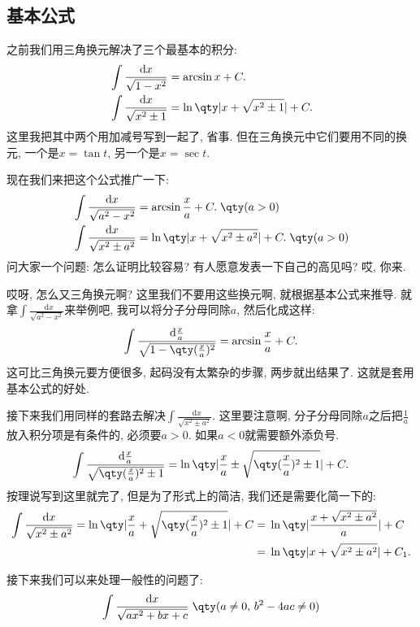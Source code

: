 \documentclass{ctexbook}
\newcommand*{\dif}{\mathop{}\!\mathrm{d}}
\begin{document}
{\subsection{基本公式}
之前我们用三角换元解决了三个最基本的积分: 
\begin{align*}
{}&\int\frac{\dif{x}}{\sqrt{1-x^{2}}}=\arcsin{x}+C.\\
{}&\int\frac{\dif{x}}{\sqrt{x^{2}\pm1}}=\ln\qty|x+\sqrt{x^{2}\pm1}|+C
.\end{align*}
这里我把其中两个用加减号写到一起了, 省事. 但在三角换元中它们要用不同的换元, 一个是$x=\tan{t}$, 另一个是$x=\sec{t}$. \par
现在我们来把这个公式推广一下: 
\begin{align*}
{}&\int\frac{\dif{x}}{\sqrt{a^{2}-x^{2}}}=\arcsin{\frac{x}{a}}+C.\;\qty(a>0)\\
{}&\int\frac{\dif{x}}{\sqrt{x^{2}\pm a^{2}}}=\ln\qty|x+\sqrt{x^{2}\pm a^{2}}|+C.\;\qty(a>0)
\end{align*}
问大家一个问题: 怎么证明比较容易? 有人愿意发表一下自己的高见吗? 哎, 你来. \par
哎呀, 怎么又三角换元啊? 这里我们不要用这些换元啊, 就根据基本公式来推导. 就拿$\int\frac{\dif{x}}{\sqrt{a^{2}-x^{2}}}$来举例吧, 我可以将分子分母同除$a$, 然后化成这样: 
\begin{align*}
\int\frac{\dif{\frac{x}{a}}}{\sqrt{1-\qty(\frac{x}{a})^{2}}}=\arcsin{\frac{x}{a}}+C
.\end{align*}
这可比三角换元要方便很多, 起码没有太繁杂的步骤, 两步就出结果了. 这就是套用基本公式的好处. \par
接下来我们用同样的套路去解决$\int\frac{\dif{x}}{\sqrt{x^{2}\pm a^{2}}}$. 这里要注意啊, 分子分母同除$a$之后把$\frac{1}{a}$放入积分项是有条件的, 必须要$a>0$. 如果$a<0$就需要额外添负号. 
\begin{align*}
\int\frac{\dif{\frac{x}{a}}}{\sqrt{\qty(\frac{x}{a})^{2}\pm1}}=\ln\qty|\frac{x}{a}\pm\sqrt{\qty(\frac{x}{a})^{2}\pm1}|+C
.\end{align*}
按理说写到这里就完了, 但是为了形式上的简洁, 我们还是需要化简一下的: 
\begin{align*}
\int\frac{\dif{x}}{\sqrt{x^{2}\pm a^{2}}}=\ln\qty|\frac{x}{a}+\sqrt{\qty(\frac{x}{a})^{2}\pm1}|+C={}&\ln\qty|\frac{x+\sqrt{x^{2}\pm a^{2}}}{a}|+C\\
={}&\ln\qty|x+\sqrt{x^{2}\pm a^{2}}|+C_{1}
.\end{align*}\par
接下来我们可以来处理一般性的问题了: 
\begin{align*}
\int\frac{\dif{x}}{\sqrt{ax^{2}+bx+c}}\;\qty(a\ne0,\,b^{2}-4ac\ne0)

\end{align*}}
\end{document}
